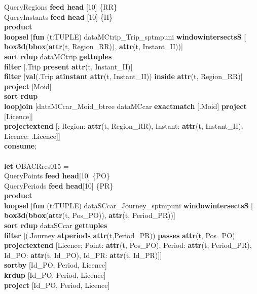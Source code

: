 \documentclass[a4paper]{article}
\newcommand{\op}[1]{\textbf{#1}}
\begin{document}
\begin{scriptsize}
\begin{tabbing}
\>QueryRegions  \op{feed head} [10] \{RR\}\\
\>QueryInstants \op{feed head} [10] \{II\}\\
\>\op{product}\\
\>\op{loopsel} [\op{fun} (t:TUPLE) dataMCtrip\_Trip\_sptmpuni \op{windowintersectsS} [\\
\>\>\>\>\op{box3d}(\op{bbox}(\op{attr}(t, Region\_RR)), \op{attr}(t, Instant\_II))]\\
\>\>\op{sort rdup} dataMCtrip \op{gettuples}\\
\>\>\op{filter} [.Trip \op{present} \op{attr}(t, Instant\_II)]\\
\>\>\op{filter} [\op{val}(.Trip \op{atinstant} \op{attr}(t, Instant\_II)) \op{inside} \op{attr}(t, Region\_RR)]\\
\>\>\op{project} [Moid]\\
\>\>\op{sort rdup}\\
\>\>\op{loopjoin} [dataMCcar\_Moid\_btree dataMCcar \op{exactmatch} [.Moid] \op{project} [Licence]]\\
\>\>\op{projectextend} [; Region: \op{attr}(t, Region\_RR), Instant: \op{attr}(t, Instant\_II), Licence: .Licence]]\\
\op{consume};\\
\\
\op{let} OBACRres015 =\\
\>QueryPoints  \op{feed head}[10] \{PO\}\\
\>QueryPeriods \op{feed head}[10] \{PR\}\\
\>\op{product}\\
\>\op{loopsel} [\op{fun} (t:TUPLE) dataSCcar\_Journey\_sptmpuni \op{windowintersectsS} [\\
\>\>\>\>\op{box3d}(\op{bbox}(\op{attr}(t, Pos\_PO)), \op{attr}(t, Period\_PR))]\\
\>\>\op{sort rdup} dataSCcar \op{gettuples}\\
\>\>\op{filter} [(.Journey \op{atperiods} \op{attr}(t,Period\_PR)) \op{passes} \op{attr}(t, Pos\_PO)]\\
\>\>\op{projectextend} [Licence; Point: \op{attr}(t, Pos\_PO), Period: \op{attr}(t, Period\_PR),\\
\>\>\>\>Id\_PO: \op{attr}(t, Id\_PO), Id\_PR: \op{attr}(t, Id\_PR)]]\\
\>\op{sortby} [Id\_PO, Period, Licence]\\
\>\op{krdup} [Id\_PO, Period, Licence]\\
\>\op{project} [Id\_PO, Period, Licence]\\

\end{tabbing}
\end{scriptsize}
\end{document}
